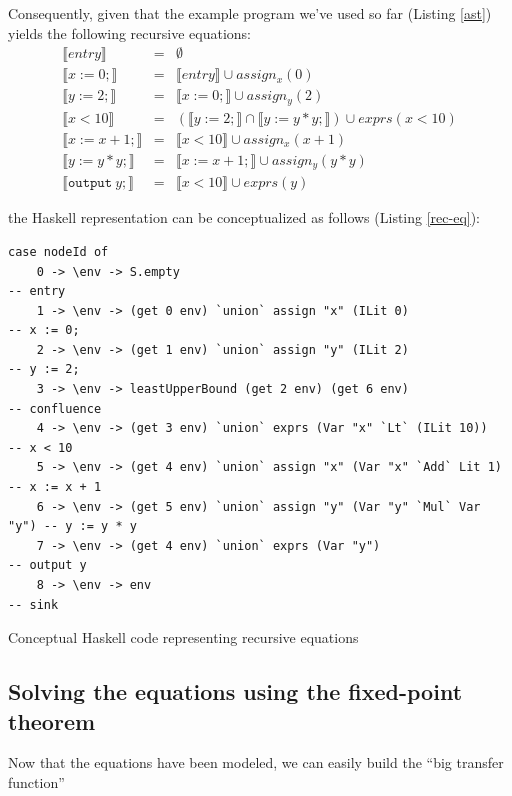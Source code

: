 \documentclass{article}
\begin{document}
Consequently, given that the example program we've used so far (Listing \ref{ast}) yields
the following recursive equations: \begin{equation}
\begin{array}{lll}
⟦entry⟧   &=& \emptyset \\
⟦x := 0;⟧ &=& ⟦entry⟧ ∪ assign_x(0) \\
⟦y := 2;⟧ &=& ⟦x := 0;⟧ ∪ assign_y(2) \\
⟦x < 10⟧  &=& (⟦y := 2;⟧ ∩ ⟦y := y * y;⟧) ∪ exprs(x < 10) \\
⟦x := x + 1;⟧ &=& ⟦x < 10⟧ ∪ assign_x(x + 1) \\
⟦y := y * y;⟧ &=& ⟦x := x + 1;⟧ ∪ assign_y(y * y) \\
⟦\mathtt{output\ }y;⟧   &=& ⟦x < 10⟧ ∪ exprs(y)
\end{array}
\end{equation}

the Haskell representation can be conceptualized as follows (Listing \ref{rec-eq}):

\begin{listing}[H]
\begin{verbatim}
case nodeId of
    0 -> \env -> S.empty                                                -- entry
    1 -> \env -> (get 0 env) `union` assign "x" (ILit 0)                -- x := 0;
    2 -> \env -> (get 1 env) `union` assign "y" (ILit 2)                -- y := 2;
    3 -> \env -> leastUpperBound (get 2 env) (get 6 env)                -- confluence
    4 -> \env -> (get 3 env) `union` exprs (Var "x" `Lt` (ILit 10))     -- x < 10
    5 -> \env -> (get 4 env) `union` assign "x" (Var "x" `Add` Lit 1)   -- x := x + 1
    6 -> \env -> (get 5 env) `union` assign "y" (Var "y" `Mul` Var "y") -- y := y * y
    7 -> \env -> (get 4 env) `union` exprs (Var "y")                    -- output y
    8 -> \env -> env                                                    -- sink
\end{verbatim}
\caption{Conceptual Haskell code representing recursive equations}
\label{rec-eq}
\end{listing}

\subsection{Solving the equations using the fixed-point
theorem}\label{solving-the-equations-using-the-fixed-point-theorem}

Now that the equations have been modeled, we can easily build the ``big
transfer function''
\end{document}
